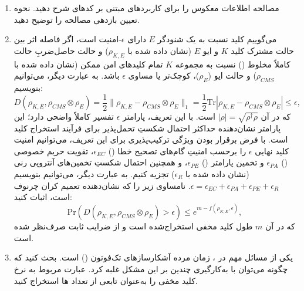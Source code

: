 \begin{enumerate}
	\item مصالحه اطلاعات معکوس را برای کاربردهای  مبتنی بر کدهای  شرح دهید. نحوه تعیین بازدهی مصالحه را توضیح دهید.
	
	\item می‌گوییم کلید نسبت به یک شنودگر $E$ دارای $\epsilon$-امنیت است، اگر فاصله اثر بین حالت مشترک کلید $K$ و ایو $E$ (نشان داده شده با $\rho_{K,E}$) و حالت حاصل‌ضربِ حالت کاملاً مخلوط () نسبت به مجموعه $K$ تمام کلیدهای امن ممکن (نشان داده شده با $\rho_{CMS}$) و حالت ایو ($\rho_E$)، کوچک‌تر یا مساوی $\epsilon$ باشد. به عبارت دیگر، می‌توانیم بنویسیم:
	\begin{equation}
		D(\rho_{K,E}, \rho_{CMS} \otimes \rho_E) = \frac{1}{2} \|\rho_{K,E} - \rho_{CMS} \otimes \rho_E\|_1 = \frac{1}{2} \text{Tr} |\rho_{K,E} - \rho_{CMS} \otimes \rho_E| \leq \epsilon,
		\label{eq:7-147}
	\end{equation}
	که در آن $|\rho| = \sqrt{\rho^\dagger \rho}$ است. با این تعریف، پارامتر $\epsilon$ تفسیر کاملاً واضحی دارد؛ این پارامتر نشان‌دهنده حداکثر احتمال شکستِ تحمل‌پذیر برای فرآیند استخراج کلید است. با فرض برقرار بودن ویژگی ترکیب‌پذیری برای این تعریف، می‌توانیم امنیت کلید نهایی $\epsilon$ را برحسب امنیتِ گام‌های تصحیح خطا () $\epsilon_{EC}$، تقویت حریم خصوصی () $\epsilon_{PA}$ و تخمین پارامتر () $\epsilon_{PE}$، و همچنین احتمال شکستِ تخمین‌های آنتروپی رنی (نشان داده شده با $\epsilon_R$) تجزیه کنیم. به عبارت دیگر، می‌توانیم بنویسیم $\epsilon = \epsilon_{EC} + \epsilon_{PA} + \epsilon_{PE} + \epsilon_R$. نامساوی زیر را که نشان‌دهنده تعمیم کران چرنوف است، اثبات کنید:
	\begin{equation}
		\text{Pr} \left( D(\rho_{K,E}, \rho_{CMS} \otimes \rho_E) > \epsilon \right) \leq e^{m - f(\rho_{K,E}, \epsilon)},
		\label{eq:7-148}
	\end{equation}
	که در آن $m$ طول کلید مخفی استخراج‌شده است و از ضرایب ثابت صرف‌نظر شده است.
	
	\item یکی از مسائل مهم در ، زمان مرده آشکارسازهای تک‌فوتون () است. بحث کنید که چگونه می‌توان با به‌کارگیری چندین  بر این مشکل غلبه کرد. عبارت مربوط به نرخ کلید مخفی را به‌عنوان تابعی از تعداد ها استخراج کنید.
\end{enumerate}








